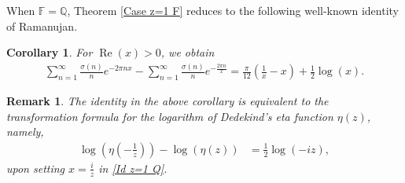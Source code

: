\documentclass[12pt,reqno]{amsart}
\newcommand{\Arg}{\operatorname{Arg}}
\renewcommand{\Re}{\operatorname{Re}}
\renewcommand{\(}{\left\(}
\renewcommand{\)}{\right\)}
\renewcommand{\[}{\left\[}
\renewcommand{\]}{\right\]}
\numberwithin{equation}{section}
\theoremstyle{plain}
\newtheorem{remark}[]{Remark}
\newtheorem{corollary}[theorem]{Corollary}
\begin{document}

When $\mathbb{F}=\mathbb{Q}$, Theorem \ref{Case z=1 F} reduces to the following well-known identity of Ramanujan.
\begin{corollary}\label{Case z=1 Q}
For $\Re(x) > 0$, we obtain
\begin{align}\label{Id z=1 Q}
\sum_{n=1}^{\infty}\frac{\sigma(n)}{n}e^{-2\pi nx} - \sum_{n=1}^{\infty}\frac{\sigma(n)}{n}e^{-\frac{2\pi n}{x}} = \frac{\pi}{12}\left(\frac{1}{x} - x \right) + \frac{1}{2}\log(x).
\end{align}
\end{corollary}
\begin{remark}
The identity in the above corollary is equivalent to the transformation formula for the logarithm of Dedekind’s eta function $\eta(z)$, namely,
\begin{align*}
\log\left(\eta\left(-\frac{1}{z}\right)\right) - \log(\eta(z)) &= \frac{1}{2}\log(-iz),
\end{align*}
upon setting $x=\frac{i}{z}$ in \eqref{Id z=1 Q}.
\end{remark}
\end{document}
